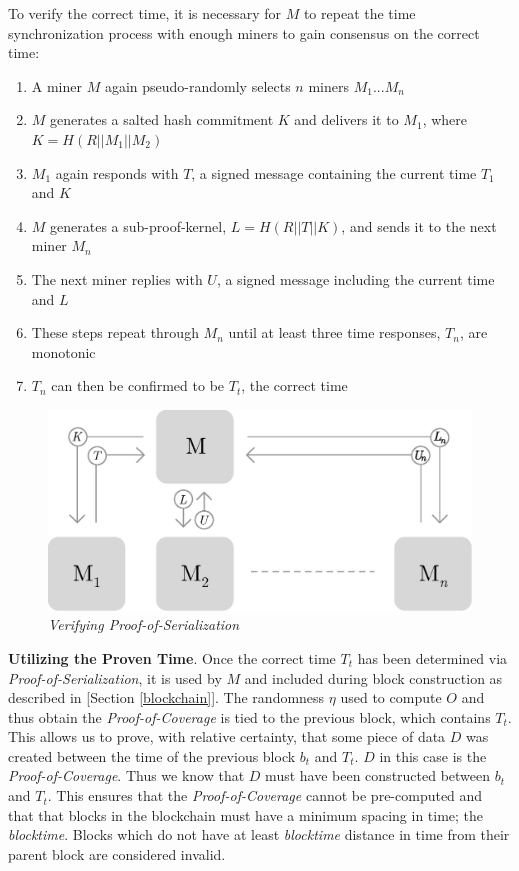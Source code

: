 \documentclass[10pt, nonatbib, nocopyrightspace, reprint]{sigplanconf}
\begin{document}
To verify the correct time, it is necessary for $M$ to repeat the time synchronization process with enough miners to gain consensus on the correct time:

\begin{enumerate}
    \item A miner $M$ again pseudo-randomly selects $n$ miners $M_1$...$M_n$
    \item $M$ generates a salted hash commitment $K$ and delivers it to $M_1$, where ${K = H\left(R || M_1 || M_2\right)}$
    \item $M_1$ again responds with $T$, a signed message containing the current time $T_1$ and $K$
    \item $M$ generates a sub-proof-kernel, $L = H\left(R || T || K\right)$, and sends it to the next miner $M_n$
    \item The next miner replies with $U$, a signed message including the current time and $L$
    \item These steps repeat through $M_n$ until at least three time responses, $T_n$, are monotonic
    \item $T_n$ can then be confirmed to be $T_t$, the correct time
\end{enumerate}

\begin{figure}[H]
    \begin{center}
          \includegraphics[width=\columnwidth]{verify_serialization.eps}
          \caption{\emph{Verifying Proof-of-Serialization}}
          \label{fig:verify-serialization}
     \end{center}
\end{figure}

\textbf{Utilizing the Proven Time}. Once the correct time $T_t$ has been determined via \emph{Proof-of-Serialization}, it is used by $M$ and included during block construction as described in [Section \ref{blockchain}]. The randomness $\eta$ used to compute $O$ and thus obtain the \emph{Proof-of-Coverage} is tied to the previous block, which contains $T_t$. This allows us to prove, with relative certainty, that some piece of data $D$ was created between the time of the previous block $b_t$ and $T_t$. $D$ in this case is the \emph{Proof-of-Coverage}. Thus we know that $D$ must have been constructed between $b_t$ and $T_t$. This ensures that the \emph{Proof-of-Coverage} cannot be pre-computed and that that blocks in the blockchain must have a minimum spacing in time; the \emph{blocktime}. Blocks which do not have at least \emph{blocktime} distance in time from their parent block are considered invalid.
\end{document}

